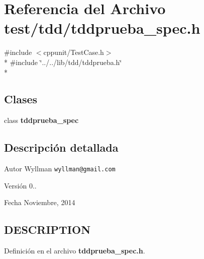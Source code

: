 \section{Referencia del Archivo test/tdd/tddprueba\+\_\+spec.h}
\label{tddprueba__spec_8h}
{\ttfamily \#include $<$cppunit/\+Test\+Case.\+h$>$}\\*
{\ttfamily \#include \char`\"{}../../lib/tdd/tddprueba.\+h\char`\"{}}\\*
\subsection*{Clases}
\begin{DoxyCompactItemize}
\item 
class {\bf tddprueba\+\_\+spec}
\end{DoxyCompactItemize}


\subsection{Descripción detallada}
\begin{DoxyAuthor}{Autor}
Wyllman {\tt wyllman@gmail.\+com} 
\end{DoxyAuthor}
\begin{DoxyVersion}{Versión}
0.. 
\end{DoxyVersion}
\begin{DoxyDate}{Fecha}
Noviembre, 2014 
\end{DoxyDate}
\subsection{D\+E\+S\+C\+R\+I\+P\+T\+I\+O\+N}\label{main_8cpp_DESCRIPTION}


Definición en el archivo {\bf tddprueba\+\_\+spec.\+h}.

